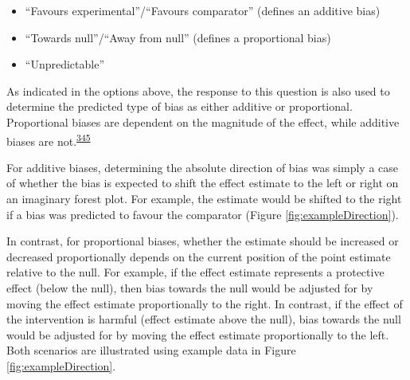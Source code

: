 \documentclass[a4paper, twoside]{templates/ociamthesis}
\providecommand{\tightlist}{%
  \setlength{\itemsep}{0pt}\setlength{\parskip}{0pt}}
\begin{document}
\begin{itemize}
\tightlist
\item
  ``Favours experimental''/``Favours comparator'' (defines an additive bias)
\item
  ``Towards null''/``Away from null'' (defines a proportional bias)
\item
  ``Unpredictable''
\end{itemize}

As indicated in the options above, the response to this question is also used to determine the predicted type of bias as either additive or proportional. Proportional biases are dependent on the magnitude of the effect, while additive biases are not.\textsuperscript{\protect\hyperlink{ref-turner2009}{345}}

For additive biases, determining the absolute direction of bias was simply a case of whether the bias is expected to shift the effect estimate to the left or right on an imaginary forest plot. For example, the estimate would be shifted to the right if a bias was predicted to favour the comparator (Figure \ref{fig:exampleDirection}).

In contrast, for proportional biases, whether the estimate should be increased or decreased proportionally depends on the current position of the point estimate relative to the null. For example, if the effect estimate represents a protective effect (below the null), then bias towards the null would be adjusted for by moving the effect estimate proportionally to the right. In contrast, if the effect of the intervention is harmful (effect estimate above the null), bias towards the null would be adjusted for by moving the effect estimate proportionally to the left. Both scenarios are illustrated using example data in Figure \ref{fig:exampleDirection}.
\end{document}
